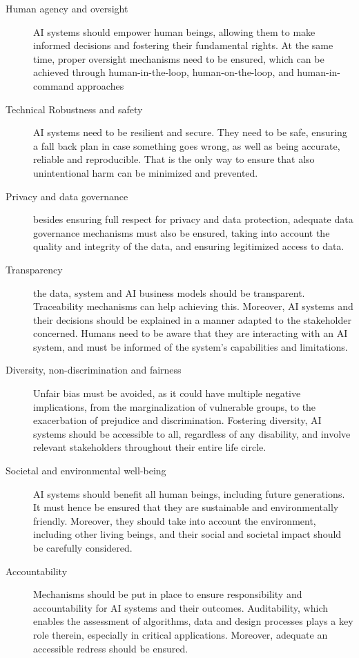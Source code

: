 \begin{description}
    \item[Human agency and oversight] AI systems should empower human beings, allowing them to make informed decisions and fostering their fundamental rights. At the same time, proper oversight mechanisms need to be ensured, which can be achieved through human-in-the-loop, human-on-the-loop, and human-in-command approaches
    \item[Technical Robustness and safety] AI systems need to be resilient and secure. They need to be safe, ensuring a fall back plan in case something goes wrong, as well as being accurate, reliable and reproducible. That is the only way to ensure that also unintentional harm can be minimized and prevented.
    \item[Privacy and data governance] besides ensuring full respect for privacy and data protection, adequate data governance mechanisms must also be ensured, taking into account the quality and integrity of the data, and ensuring legitimized access to data.
    \item[Transparency] the data, system and AI business models should be transparent. Traceability mechanisms can help achieving this. Moreover, AI systems and their decisions should be explained in a manner adapted to the stakeholder concerned. Humans need to be aware that they are interacting with an AI system, and must be informed of the system’s capabilities and limitations.
    \item[Diversity, non-discrimination and fairness] Unfair bias must be avoided, as it could have multiple negative implications, from the marginalization of vulnerable groups, to the exacerbation of prejudice and discrimination. Fostering diversity, AI systems should be accessible to all, regardless of any disability, and involve relevant stakeholders throughout their entire life circle.
    \item[Societal and environmental well-being] AI systems should benefit all human beings, including future generations. It must hence be ensured that they are sustainable and environmentally friendly. Moreover, they should take into account the environment, including other living beings, and their social and societal impact should be carefully considered. 
    \item[Accountability] Mechanisms should be put in place to ensure responsibility and accountability for AI systems and their outcomes. Auditability, which enables the assessment of algorithms, data and design processes plays a key role therein, especially in critical applications. Moreover, adequate an accessible redress should be ensured.
\end{description}


